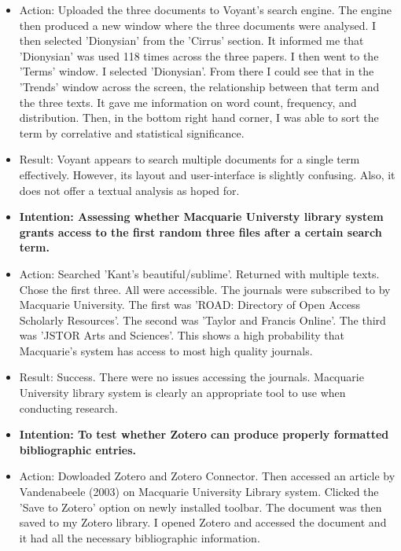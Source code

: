 \documentclass[a4paper,12pt]{article}
\begin{document}
\begin{itemize}
\begin{itemize}
\item Action: Uploaded the three documents to Voyant's search engine. The engine then produced a new window where the three documents were analysed. I then selected 'Dionysian' from the 'Cirrus' section. It informed me that 'Dionysian' was used 118 times across the three papers. I then went to the 'Terms' window. I selected 'Dionysian'. From there I could see that in the 'Trends' window across the screen, the relationship between that term and the three texts. It gave me information on word count, frequency, and distribution. Then, in the bottom right hand corner, I was able to sort the term by correlative and statistical significance. 

\item Result: Voyant appears to search multiple documents for a single term effectively. However, its layout and user-interface is slightly confusing. Also, it does not offer a textual analysis as hoped for. 

\item \textbf{Intention: Assessing whether Macquarie Universty library system grants access to the first random three files after a certain search term.}

\item Action: Searched 'Kant's beautiful/sublime'. Returned with multiple texts. Chose the first three. All were accessible. The journals were subscribed to by Macquarie University. The first was 'ROAD: Directory of Open Access Scholarly Resources'. The second was 'Taylor and Francis Online'. The third was 'JSTOR Arts and Sciences'. This shows a high probability that Macquarie's system has access to most high quality journals. 

\item Result: Success. There were no issues accessing the journals. Macquarie University library system is clearly an appropriate tool to use when conducting research. 

\item \textbf {Intention: To test whether Zotero can produce properly formatted bibliographic entries.}

\item Action: Dowloaded Zotero and Zotero Connector. Then accessed an article by Vandenabeele (2003) on Macquarie University Library system. Clicked the 'Save to Zotero' option on newly installed toolbar. The document was then saved to my Zotero library. I opened Zotero and accessed the document and it had all the necessary bibliographic information.


\end{itemize}
\end{itemize}
\end{document}
